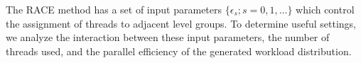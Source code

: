 


The \acrshort{RACE} method has a set of input
parameters $\{\epsilon_s; s=0,1,\ldots\}$ which control the
assignment of threads to adjacent level groups.
To determine useful settings, we analyze the interaction
between these input parameters, the number of threads used, and the
parallel efficiency of the generated workload distribution.


